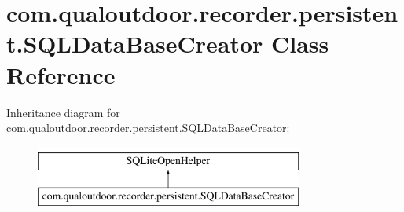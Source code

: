 \hypertarget{classcom_1_1qualoutdoor_1_1recorder_1_1persistent_1_1SQLDataBaseCreator}{\section{com.\-qualoutdoor.\-recorder.\-persistent.\-S\-Q\-L\-Data\-Base\-Creator Class Reference}
\label{classcom_1_1qualoutdoor_1_1recorder_1_1persistent_1_1SQLDataBaseCreator}
}
Inheritance diagram for com.\-qualoutdoor.\-recorder.\-persistent.\-S\-Q\-L\-Data\-Base\-Creator\-:\begin{figure}[H]
\begin{center}
\leavevmode
\includegraphics[height=2.000000cm]{classcom_1_1qualoutdoor_1_1recorder_1_1persistent_1_1SQLDataBaseCreator}
\end{center}
\end{figure}
